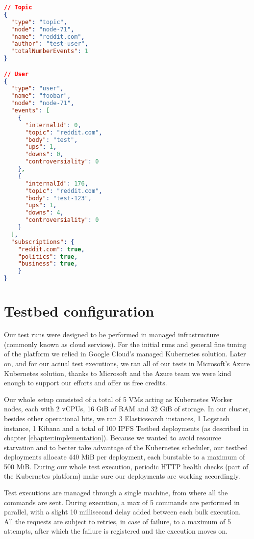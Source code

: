 \begin{lstlisting}[language=JSON, float, caption={Data example to be used in testbed},label={dataset-output}]
// Topic
{
  "type": "topic",
  "node": "node-71",
  "name": "reddit.com",
  "author": "test-user",
  "totalNumberEvents": 1
}

// User
{
  "type": "user",
  "name": "foobar",
  "node": "node-71",
  "events": [
    {
      "internalId": 0,
      "topic": "reddit.com",
      "body": "test",
      "ups": 1,
      "downs": 0,
      "controversiality": 0
    },
    {
      "internalId": 176,
      "topic": "reddit.com",
      "body": "test-123",
      "ups": 1,
      "downs": 4,
      "controversiality": 0
    }
  ],
  "subscriptions": {
  	"reddit.com": true,
  	"politics": true,
  	"business": true,
	}
}
\end{lstlisting}

\section{Testbed configuration}\label{testbed-configuration}

Our test runs were designed to be performed in managed infrastructure (commonly
known as cloud services). For the initial runs and general fine tuning of the
platform we relied in Google Cloud's managed Kubernetes solution. Later on, and
for our actual test executions, we ran all of our tests in Microsoft's Azure
Kubernetes solution, thanks to Microsoft and the Azure team we were kind enough
to support our efforts and offer us free credits.

Our whole setup consisted of a total of 5 VMs acting as Kubernetes Worker
nodes, each with 2 vCPUs, 16 GiB of RAM and 32 GiB of storage. In our cluster,
besides other operational bits, we ran 3 Elasticsearch instances, 1 Logstash
instance, 1 Kibana and a total of 100 IPFS Testbed deployments (as described in
chapter \ref{chapter:implementation}). Because we wanted to avoid resource
starvation and to better take advantage of the Kubernetes scheduler, our
testbed deployments allocate 440 MiB per deployment, each burstable to a
maximum of 500 MiB. During our whole test execution, periodic HTTP health
checks (part of the Kubernetes platform) make sure our deployments are working
accordingly.

Test executions are managed through a single machine, from where all the
commands are sent. During execution, a max of 5 commands are performed in
parallel, with a slight 10 millisecond delay added between each bulk
execution. All the requests are subject to retries, in case of failure, to a
maximum of 5 attempts, after which the failure is registered and the execution
moves on.

